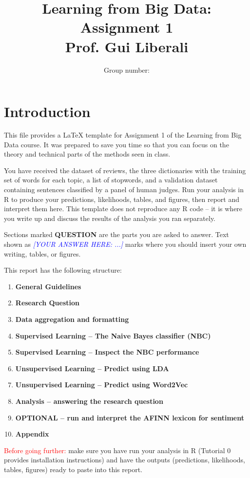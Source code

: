 \documentclass[11pt]{article}
\title{Learning from Big Data: Assignment 1\\ Prof. Gui Liberali}
\author{Group number: \dotfill}
\newcommand{\answer}[1]{%
  \textcolor{blue}{\emph{[YOUR ANSWER HERE: #1]}}
}
\begin{document}
\maketitle

\section*{Introduction}
This file provides a LaTeX template for Assignment 1 of the Learning from Big Data
course. It was prepared to save you time
so that you can focus on the theory and technical parts of the methods seen in class.

You have received the dataset of reviews, the three dictionaries with the training set
of words for each topic, a list of stopwords, and a validation dataset containing
sentences classified by a panel of human judges. Run your analysis in R to produce your predictions, likelihoods, tables, and figures, then report and interpret them here. This template does not reproduce any R code -- it is
where you write up and discuss the results of the analysis you ran separately.

Sections marked \textbf{QUESTION} are the parts you are asked to answer. Text shown as
\answer{...} marks where you should insert your own writing, tables, or figures.

This report has the following structure:
\begin{enumerate}
  \item \textbf{General Guidelines}
  \item \textbf{Research Question}
  \item \textbf{Data aggregation and formatting}
  \item \textbf{Supervised Learning -- The Naive Bayes classifier (NBC)}
  \item \textbf{Supervised Learning -- Inspect the NBC performance}
  \item \textbf{Unsupervised Learning -- Predict using LDA}
  \item \textbf{Unsupervised Learning -- Predict using Word2Vec}
  \item \textbf{Analysis -- answering the research question}
  \item \textbf{OPTIONAL -- run and interpret the AFINN lexicon for sentiment}
  \item \textbf{Appendix}
\end{enumerate}

\textcolor{red}{Before going further:} make sure you have run your analysis in R
(Tutorial 0 provides installation instructions) and have the outputs (predictions,
likelihoods, tables, figures) ready to paste into this report.
\end{document}
